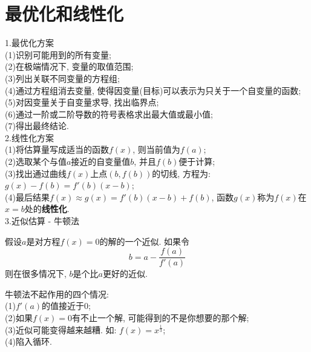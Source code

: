 \chapter{最优化和线性化}
1.最优化方案\\
(1)识别可能用到的所有变量;\\
(2)在极端情况下, 变量的取值范围;\\
(3)列出关联不同变量的方程组;\\
(4)通过方程组消去变量, 使得因变量(目标)可以表示为只关于一个自变量的函数;\\
(5)对因变量关于自变量求导, 找出临界点;\\
(6)通过一阶或二阶导数的符号表格求出最大值或最小值;\\
(7)得出最终结论.\\[2ex]

2.线性化方案\\
(1)将估算量写成适当的函数$f(x)$, 则当前值为$f(a)$;\\
(2)选取某个与值$a$接近的自变量值$b$, 并且$f(b)$便于计算;\\
(3)找出通过曲线$f(x)$上点$(b,f(b))$的切线, 方程为: $g(x)-f(b)=f'(b)(x-b)$;\\
(4)最后结果$f(x)\approx g(x)=f'(b)(x-b)+f(b)$, 函数$g(x)$称为$f(x)$在$x=b$处的\textbf{线性化}.\\[2ex]

3.近似估算 - 牛顿法\\[-4ex]
\begin{theorem}[牛顿法]
假设$a$是对方程$f(x)=0$的解的一个近似. 如果令
\[b=a-\frac{f(a)}{f'(a)}\]
则在很多情况下, $b$是个比$a$更好的近似.
\end{theorem}
牛顿法不起作用的四个情况:\\
(1)$f'(a)$的值接近于$0$;\\
(2)如果$f(x)=0$有不止一个解, 可能得到的不是你想要的那个解;\\
(3)近似可能变得越来越糟. 如: $f(x)=x^{\frac{1}{3}}$;\\
(4)陷入循环.\\
